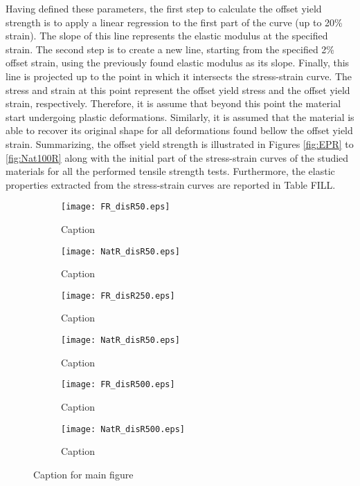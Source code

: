 Having defined these parameters, the first step to calculate the offset yield strength is to apply a linear regression to the first part of the curve (up to 20\% strain). The slope of this line represents the elastic modulus at the specified strain. The second step is to create a new line, starting from the specified 2\% offset strain, using the previously found elastic modulus as its slope. Finally, this line is projected up to the point in which it intersects the stress-strain curve. The stress and strain at this point represent the offset yield stress and the offset yield strain, respectively. Therefore, it is assume that beyond this point the material start undergoing plastic deformations. Similarly, it is assumed that the material is able to recover its original shape for all deformations found bellow the offset yield strain. Summarizing, the offset yield strength is illustrated in Figures \ref{fig:EPR} to \ref{fig:Nat100R} along with the initial part of the stress-strain curves of the studied materials for all the performed tensile strength tests. 
Furthermore, the elastic properties extracted from the stress-strain curves are reported in Table FILL.

\newpage
\begin{figure}[H]
    \centering
    \begin{subfigure}[b]{0.49\textwidth}
        \centering
        \texttt{[image: FR\_disR50.eps]}
        \caption{Caption}
        \label{fig:FR50}
    \end{subfigure}
    \hfill
    \begin{subfigure}[b]{0.49\textwidth}
        \centering
        \texttt{[image: NatR\_disR50.eps]}
        \caption{Caption}
        \label{fig:FR250}
    \end{subfigure}
    \hfill
    \begin{subfigure}[b]{0.49\textwidth}
        \centering
        \texttt{[image: FR\_disR250.eps]}
        \caption{Caption}
        \label{fig:FR500}
    \end{subfigure}
    \hfill
    \begin{subfigure}[b]{0.49\textwidth}
        \centering
        \texttt{[image: NatR\_disR50.eps]}
        \caption{Caption}
        \label{fig:NatR50}
    \end{subfigure}
    \hfill
    \begin{subfigure}[b]{0.49\textwidth}
        \centering
        \texttt{[image: FR\_disR500.eps]}
        \caption{Caption}
        \label{fig:NatR250}
    \end{subfigure}
    \hfill
    \begin{subfigure}[b]{0.49\textwidth}
        \centering
        \texttt{[image: NatR\_disR500.eps]}
        \caption{Caption}
        \label{fig:NatR500}
    \end{subfigure}
    \caption{Caption for main figure}
    \label{fig:FRandNatR}
\end{figure}

